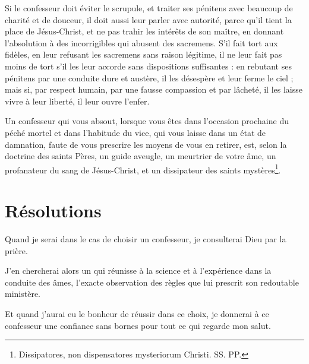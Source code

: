 \documentclass[instructions.tex]{subfiles}
\begin{document}
Si le confesseur doit éviter le scrupule, et traiter ses pénitens avec beaucoup de charité et de douceur, il doit aussi leur parler avec autorité, parce qu’il tient la place de Jésus-Christ, et ne pas trahir les intérêts de son maître, en donnant l’absolution à des incorrigibles qui abusent des sacremens. S’il fait tort aux fidèles, en leur refusant les sacremens sans raison légitime, il ne leur fait pas moins de tort s’il les leur accorde sans dispositions suffisantes : en rebutant ses pénitens par une conduite dure et austère, il les désespère et leur ferme le ciel ; mais si, par respect humain, par une fausse compassion et par lâcheté, il les laisse vivre à leur liberté, il leur ouvre l’enfer.
 
Un confesseur qui vous absout, lorsque vous êtes dans l’occasion prochaine du péché mortel et dans l’habitude du vice, qui vous laisse dans un état de damnation, faute de vous prescrire les moyens de vous en retirer, est, selon la doctrine des saints Pères, un guide aveugle, un meurtrier de votre âme, un profanateur du sang de Jésus-Christ, et un dissipateur des saints mystères\footnote{Dissipatores, non dispensatores mysteriorum Christi. SS. PP.}.
 
\section{Résolutions}
 
\primo Quand je serai dans le cas de choisir un confesseur, je consulterai Dieu par la prière. 

\secundo J’en chercherai alors un qui réunisse à la science et à l’expérience dans la conduite des âmes, l’exacte observation des règles que lui prescrit son redoutable ministère. 

\tertio Et quand j’aurai eu le bonheur de réussir dans ce choix, je donnerai à ce confesseur une confiance sans bornes pour tout ce qui regarde mon salut. 

 
\end{document}
